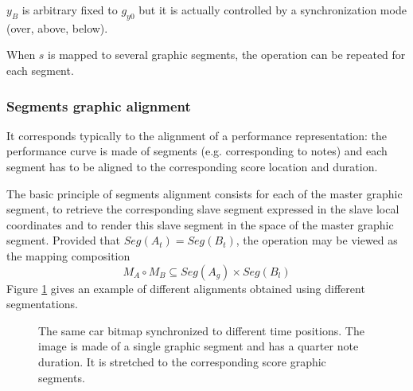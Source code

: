 \documentclass{article}
\newcommand{\seg}[1]			{Seg(#1)}
\begin{document}
$y_B$ is arbitrary fixed to $g_{y0}$ but it is actually controlled by a synchronization mode (over, above, below).

When $s$ is mapped to several graphic segments, the operation can be repeated for each segment.


\subsubsection{Segments graphic alignment}

It corresponds typically to the alignment of a performance representation: the performance curve is made of segments (e.g. corresponding to notes) and each segment has to be aligned to the corresponding score location and duration.

The basic principle of segments alignment consists for each of the master graphic segment, to retrieve the corresponding slave segment expressed in the slave local coordinates and to render this slave segment in the space of the master graphic segment.
Provided that $\seg{A_t} = \seg{B_t}$, the operation may be viewed as the mapping composition 
\[
M_{A} \circ M_{B} \subseteq \seg{A_{g}}\times \seg{B_{l}}
\]
Figure \ref{fig:align} gives an example of different alignments obtained using different segmentations.
\begin{figure}[htbp]
\centerline{}
\caption{The same car bitmap synchronized to different time positions. The image is made of a single graphic segment and has a quarter note duration. It is stretched to the corresponding score graphic segments.}
\label{fig:align}
\end{figure}
\end{document}
